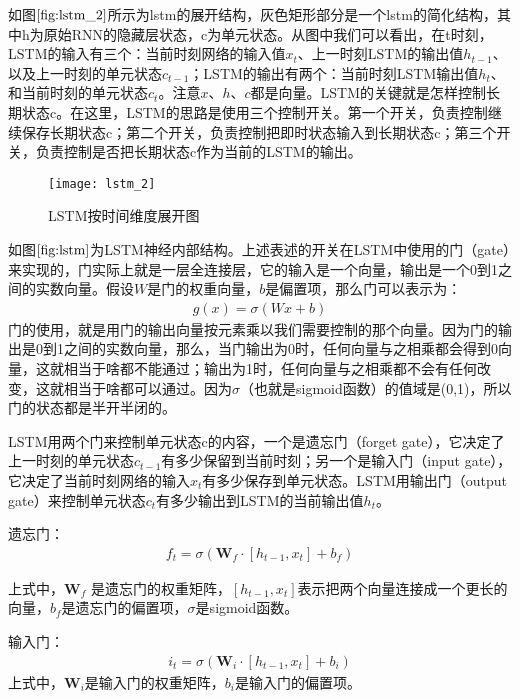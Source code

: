 如图$\ref{fig:lstm_2}$所示为lstm的展开结构，灰色矩形部分是一个lstm的简化结构，其中h为原始RNN的隐藏层状态，c为单元状态。从图中我们可以看出，在t时刻，LSTM的输入有三个：当前时刻网络的输入值$x_{t}$、上一时刻LSTM的输出值$h_{t-1}$、以及上一时刻的单元状态$c_{t-1}$；LSTM的输出有两个：当前时刻LSTM输出值$h_{t}$、和当前时刻的单元状态$c_{t}$。注意$x$、$h$、$c$都是向量。LSTM的关键就是怎样控制长期状态c。在这里，LSTM的思路是使用三个控制开关。第一个开关，负责控制继续保存长期状态c；第二个开关，负责控制把即时状态输入到长期状态c；第三个开关，负责控制是否把长期状态c作为当前的LSTM的输出。
\begin{figure}[htbp]
\centering
\texttt{[image: lstm\_2]}
\caption{LSTM按时间维度展开图}
\label{fig:lstm_2}
\end{figure}
如图$\ref{fig:lstm}$为LSTM神经内部结构。上述表述的开关在LSTM中使用的门（gate）来实现的，门实际上就是一层全连接层，它的输入是一个向量，输出是一个0到1之间的实数向量。假设$W$是门的权重向量，$b$是偏置项，那么门可以表示为：
\begin{displaymath}
\begin{aligned}
g(x)=\sigma (W x+b)
\end{aligned}
\end{displaymath}
门的使用，就是用门的输出向量按元素乘以我们需要控制的那个向量。因为门的输出是0到1之间的实数向量，那么，当门输出为0时，任何向量与之相乘都会得到0向量，这就相当于啥都不能通过；输出为1时，任何向量与之相乘都不会有任何改变，这就相当于啥都可以通过。因为$\sigma$（也就是sigmoid函数）的值域是(0,1)，所以门的状态都是半开半闭的。

LSTM用两个门来控制单元状态c的内容，一个是遗忘门（forget gate），它决定了上一时刻的单元状态$c_{t-1}$有多少保留到当前时刻；另一个是输入门（input gate），它决定了当前时刻网络的输入$x_{t}$有多少保存到单元状态。LSTM用输出门（output gate）来控制单元状态$c_{t}$有多少输出到LSTM的当前输出值$h_{t}$。

遗忘门：
\begin{equation}
\begin{aligned}
f_{t}=\sigma (\mathbf{W}_{f} \cdot [h_{t-1}, x_{t}]+b_{f})
\end{aligned}
\end{equation}

上式中，$\mathbf{W}_{f}$ 是遗忘门的权重矩阵，$[h_{t-1}, x_{t}]$表示把两个向量连接成一个更长的向量，$b_{f}$是遗忘门的偏置项，$\sigma$是sigmoid函数。

输入门：
\begin{equation}
\begin{aligned}
i_{t}=\sigma (\mathbf{W}_{i} \cdot [h_{t-1}, x_{t}]+b_{i})
\end{aligned}
\end{equation}
上式中，$\mathbf{W}_{i}$是输入门的权重矩阵，$b_{i}$是输入门的偏置项。

